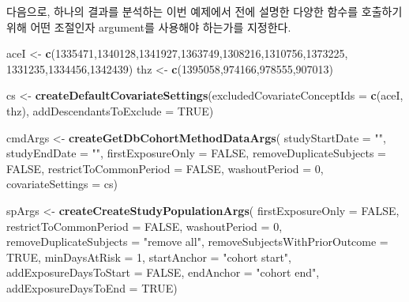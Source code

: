 \documentclass[11pt]{book}
\newenvironment{Shaded}{\begin{snugshade}}{\end{snugshade}}
\newcommand{\KeywordTok}[1]{\textcolor[rgb]{0.13,0.29,0.53}{\textbf{#1}}}
\newcommand{\DataTypeTok}[1]{\textcolor[rgb]{0.13,0.29,0.53}{#1}}
\newcommand{\DecValTok}[1]{\textcolor[rgb]{0.00,0.00,0.81}{#1}}
\newcommand{\StringTok}[1]{\textcolor[rgb]{0.31,0.60,0.02}{#1}}
\newcommand{\OtherTok}[1]{\textcolor[rgb]{0.56,0.35,0.01}{#1}}
\newcommand{\NormalTok}[1]{#1}
\theoremstyle{definition}
\theoremstyle{definition}
\theoremstyle{definition}
\theoremstyle{remark}
\begin{document}
다음으로, 하나의 결과를 분석하는 이번 예제에서 전에 설명한 다양한 함수를
호출하기 위해 어떤 조절인자 argument를 사용해야 하는가를 지정한다.

\begin{Shaded}
\begin{Highlighting}[]
\NormalTok{aceI <-}\StringTok{ }\KeywordTok{c}\NormalTok{(}\DecValTok{1335471}\NormalTok{,}\DecValTok{1340128}\NormalTok{,}\DecValTok{1341927}\NormalTok{,}\DecValTok{1363749}\NormalTok{,}\DecValTok{1308216}\NormalTok{,}\DecValTok{1310756}\NormalTok{,}\DecValTok{1373225}\NormalTok{,}
          \DecValTok{1331235}\NormalTok{,}\DecValTok{1334456}\NormalTok{,}\DecValTok{1342439}\NormalTok{)}
\NormalTok{thz <-}\StringTok{ }\KeywordTok{c}\NormalTok{(}\DecValTok{1395058}\NormalTok{,}\DecValTok{974166}\NormalTok{,}\DecValTok{978555}\NormalTok{,}\DecValTok{907013}\NormalTok{)}

\NormalTok{cs <-}\StringTok{ }\KeywordTok{createDefaultCovariateSettings}\NormalTok{(}\DataTypeTok{excludedCovariateConceptIds =} \KeywordTok{c}\NormalTok{(aceI,}
\NormalTok{                                                                     thz),}
                                     \DataTypeTok{addDescendantsToExclude =} \OtherTok{TRUE}\NormalTok{)}

\NormalTok{cmdArgs <-}\StringTok{ }\KeywordTok{createGetDbCohortMethodDataArgs}\NormalTok{(}
  \DataTypeTok{studyStartDate =} \StringTok{""}\NormalTok{,}
  \DataTypeTok{studyEndDate =} \StringTok{""}\NormalTok{,}
  \DataTypeTok{firstExposureOnly =} \OtherTok{FALSE}\NormalTok{,}
  \DataTypeTok{removeDuplicateSubjects =} \OtherTok{FALSE}\NormalTok{,}
  \DataTypeTok{restrictToCommonPeriod =} \OtherTok{FALSE}\NormalTok{,}
  \DataTypeTok{washoutPeriod =} \DecValTok{0}\NormalTok{,}
  \DataTypeTok{covariateSettings =}\NormalTok{ cs)}

\NormalTok{spArgs <-}\StringTok{ }\KeywordTok{createCreateStudyPopulationArgs}\NormalTok{(}
  \DataTypeTok{firstExposureOnly =} \OtherTok{FALSE}\NormalTok{,}
  \DataTypeTok{restrictToCommonPeriod =} \OtherTok{FALSE}\NormalTok{,}
  \DataTypeTok{washoutPeriod =} \DecValTok{0}\NormalTok{,}
  \DataTypeTok{removeDuplicateSubjects =} \StringTok{"remove all"}\NormalTok{,}
  \DataTypeTok{removeSubjectsWithPriorOutcome =} \OtherTok{TRUE}\NormalTok{,}
  \DataTypeTok{minDaysAtRisk =} \DecValTok{1}\NormalTok{,}
  \DataTypeTok{startAnchor =} \StringTok{"cohort start"}\NormalTok{,}
  \DataTypeTok{addExposureDaysToStart =} \OtherTok{FALSE}\NormalTok{,}
  \DataTypeTok{endAnchor =} \StringTok{"cohort end"}\NormalTok{,}
  \DataTypeTok{addExposureDaysToEnd =} \OtherTok{TRUE}\NormalTok{)}


\end{Highlighting}
\end{Shaded}
\end{document}
